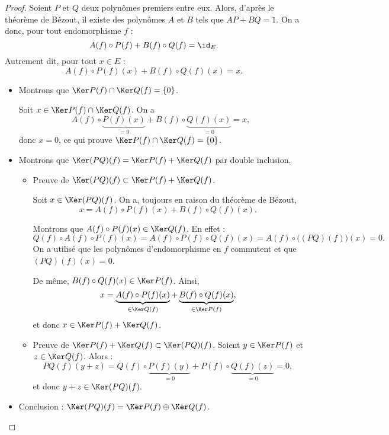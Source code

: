 \documentclass[12pt, class=report,crop=false]{standalone}
\begin{document}
\begin{proof}
Soient $P$ et $Q$ deux polynômes premiers entre eux. Alors, d'après le théorème de Bézout, il existe des polynômes $A$ et $B$ tels que $AP+BQ=1$. On a donc, pour tout endomorphisme $f$ : 
$$A(f)\circ P(f)+B(f)\circ Q(f) = \id_E.$$
Autrement dit, pour tout $x\in E$ :
$$A(f)\circ P(f)(x)+B(f)\circ Q(f)(x)=x.$$


\begin{itemize}
  \item Montrons que $\Ker P(f) \cap \Ker Q(f) = \{0\}$.
  
Soit $x\in\Ker P(f)\cap\Ker Q(f)$. On a 
$$A(f)\circ \underbrace{P(f)(x)}_{=0}+B(f)\circ\underbrace{Q(f)(x)}_{=0}=x,$$
donc $x=0$, ce qui prouve $\Ker P(f)\cap\Ker Q(f)=\{0\}$.


  \item Montrons que $\Ker(PQ)(f) = \Ker P(f) + \Ker Q(f)$ par double inclusion.
  \begin{itemize}

    
    \item Preuve de $\Ker(PQ)(f) \subset \Ker P(f) + \Ker Q(f)$.

Soit $x\in\Ker(PQ)(f)$. 
On a, toujours en raison du théorème de Bézout, 
$$x  = A(f)\circ P(f)(x)+B(f)\circ Q(f)(x).$$

Montrons que $A(f)\circ P(f)(x) \in \Ker Q(f)$. En effet :
\[Q(f) \circ A(f) \circ P(f)(x) 
= A(f) \circ  P(f) \circ Q(f) (x) 
= A(f) \circ \big((PQ)(f)\big) (x)
= 0.\]
On a utilisé que les polynômes d'endomorphisme en $f$ commutent et
que $(PQ)(f) (x) = 0$.

De même, $B(f)\circ Q(f)(x) \in \Ker P(f)$.
Ainsi,
$$x = \underbrace{A(f)\circ P(f)(x)}_{\in\Ker Q(f)}+\underbrace{B(f)\circ Q(f)(x)}_{\in\Ker P(f)},$$
et donc $x \in \Ker P(f) + \Ker Q(f)$. 

    \item Preuve de $\Ker P(f) + \Ker Q(f) \subset \Ker(PQ)(f)$.
    Soient $y \in \Ker P(f)$ et $z\in \Ker Q(f)$. Alors :
    $$PQ(f)(y+z) = Q(f) \circ \underbrace{P(f)(y)}_{=0}+P(f)\circ \underbrace{Q(f)(z)}_{=0} = 0,$$
    et donc $y+z\in \Ker(PQ)(f).$
    
\end{itemize}
  \item Conclusion : $\Ker(PQ)(f) = \Ker P(f) \oplus \Ker Q(f)$.
\end{itemize}
\end{proof}



\end{document}
